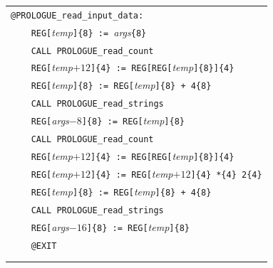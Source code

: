 \documentclass[10pt,twocolumn]{article}
\begin{document}
\begin{table}[!h]
\begin{center}
\begin{tabular}{l}
\texttt{@PROLOGUE\_read\_input\_data:}\\ %
\texttt{~~~~REG[}\textit{temp}\texttt{]\{8\} := }\textit{args}\texttt{\{8\}}\\ %
\texttt{~~~~CALL PROLOGUE\_read\_count}\\ %
\texttt{~~~~REG[}\textit{temp}$ +12 $\texttt{]\{4\} :=
REG[REG[}\textit{temp}\texttt{]\{8\}]\{4\}}\\ %
\texttt{~~~~REG[}\textit{temp}\texttt{]\{8\} := REG[}\textit{temp}\texttt{]\{8\}
+ 4\{8\}}\\ %
\texttt{~~~~CALL PROLOGUE\_read\_strings}\\ %
\texttt{~~~~REG[}\textit{args}$ -8 $\texttt{]\{8\} :=
REG[}\textit{temp}\texttt{]\{8\}}\\ %
\texttt{~~~~CALL PROLOGUE\_read\_count}\\ %
\texttt{~~~~REG[}\textit{temp}$ +12 $\texttt{]\{4\} :=
REG[REG[}\textit{temp}\texttt{]\{8\}]\{4\}}\\ %
\texttt{~~~~REG[}\textit{temp}$ +12 $\texttt{]\{4\} := REG[}\textit{temp}$ +12
$\texttt{]\{4\} *\{4\} 2\{4\}}\\ %
\texttt{~~~~REG[}\textit{temp}\texttt{]\{8\} := REG[}\textit{temp}\texttt{]\{8\}
+ 4\{8\}}\\ %
\texttt{~~~~CALL PROLOGUE\_read\_strings}\\ %
\texttt{~~~~REG[}\textit{args}$ -16 $\texttt{]\{8\} :=
REG[}\textit{temp}\texttt{]\{8\}}\\ %
\texttt{~~~~@EXIT}\\ %
\\ \\



\end{tabular}
\end{center}
\end{table}
\end{document}
